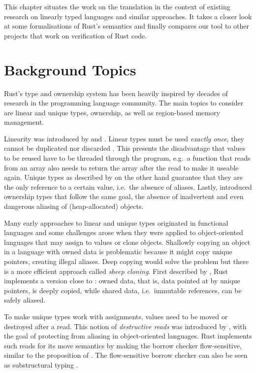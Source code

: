 This chapter situates the work on the translation in the context of existing
research on linearly typed languages and similar approaches. It takes a closer
look at some formalisations of Rust's semantics and finally compares our tool to
other projects that work on verification of Rust code.


\section{Background Topics}

Rust's type and ownership system has been heavily inspired by decades of
research in the programming language community. The main topics to consider are
linear and unique types, ownership, as well as region-based memory management.

Linearity was introduced by \citet{girard} and \citet{Wadler90lineartypes}.
Linear types must be used \emph{exactly once}, they cannot be duplicated nor
discarded \cite{use-once}. This presents the disadvantage that values to be
reused have to be threaded through the program, e.g.~a function that reads from
an array also needs to return the array after the read to make it useable again.
Unique types as described by \citet{alias-free-pointers} on the other hand
guarantee that they are the only reference to a certain value, i.e.~the absence
of aliases. Lastly, \citet{ownership-types} introduced ownership types that
follow the same goal, the absence of inadvertent and even dangerous aliasing of
(heap-allocated) objects.

Many early approaches to linear and unique types originated in functional
languages and some challenges arose when they were applied to object-oriented
languages that may assign to values or clone objects. Shallowly copying an
object in a language with owned data is problematic because it might copy unique
pointers, creating illegal aliases. Deep copying would solve the problem but
there is a more efficient approach called \emph{sheep cloning}. First described
by \citet{dynamic-alias-protection}, Rust implements a version close to
\cite{sheep-cloning}: owned data, that is, data pointed at by unique pointers,
is deeply copied, while shared data, i.e.~immutable references, can be safely
aliased.

To make unique types work with assignments, values need to be moved or destroyed
after a read. This notion of \emph{destructive reads} was introduced by
\citet{islands-alias-protection}, with the goal of protecting from aliasing in
object-oriented languages. Rust implements such reads for its move semantics by
making the borrow checker flow-sensitive, similar to the proposition of
\citet{alias-burying}. The flow-sensitive borrow checker can also be seen as
substructural typing \cite{oxide}.

